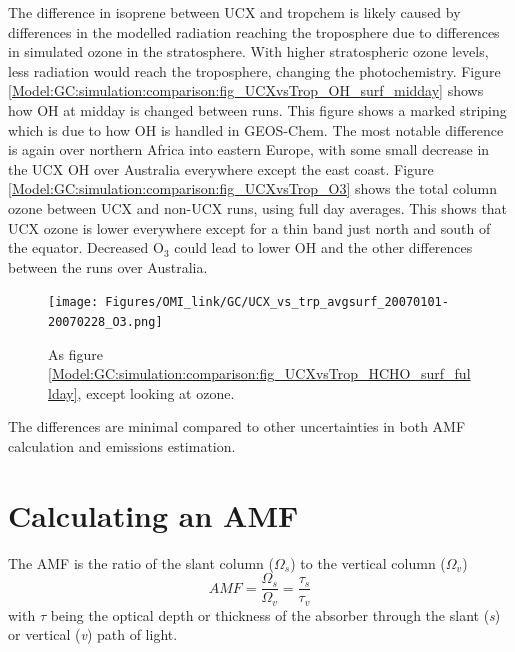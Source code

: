       
      The difference in isoprene between UCX and tropchem is likely caused by differences in the modelled radiation reaching the troposphere due to differences in simulated ozone in the stratosphere.
      With higher stratospheric ozone levels, less radiation would reach the troposphere, changing the photochemistry.
      Figure \ref{Model:GC:simulation:comparison:fig_UCXvsTrop_OH_surf_midday} shows how OH at midday is changed between runs.
      This figure shows a marked striping which is due to how OH is handled in GEOS-Chem.
      The most notable difference is again over northern Africa into eastern Europe, with some small decrease in the UCX OH over Australia everywhere except the east coast.
      Figure \ref{Model:GC:simulation:comparison:fig_UCXvsTrop_O3} shows the total column ozone between UCX and non-UCX runs, using full day averages.
      This shows that UCX ozone is lower everywhere except for a thin band just north and south of the equator.
      Decreased O$_3$ could lead to lower OH and the other differences between the runs over Australia.
      
      
      \begin{figure}
        \texttt{[image: Figures/OMI\_link/GC/UCX\_vs\_trp\_avgsurf\_20070101-20070228\_O3.png]}
        \caption{%
          As figure \ref{Model:GC:simulation:comparison:fig_UCXvsTrop_HCHO_surf_fullday}, except looking at ozone. 
        }
        \label{Model:GC:simulation:comparison:fig_UCXvsTrop_O3_surf_fullday}
      \end{figure}
      
      The differences are minimal compared to other uncertainties in both AMF calculation and emissions estimation.

      
\section{Calculating an AMF}
  \label{Model:AMF}
  
  The AMF is the ratio of the slant column ($\Omega_s$) to the vertical column ($\Omega_v$)
  \begin{equation} \label{Model:AMF:eqn_AMFFrac}
    AMF=\frac{\Omega_s}{\Omega_v} = \frac{\tau_s}{\tau_v}
  \end{equation}
  with $\tau$ being the optical depth or thickness of the absorber through the slant (\textit{s}) or vertical (\textit{v}) path of light.
  
